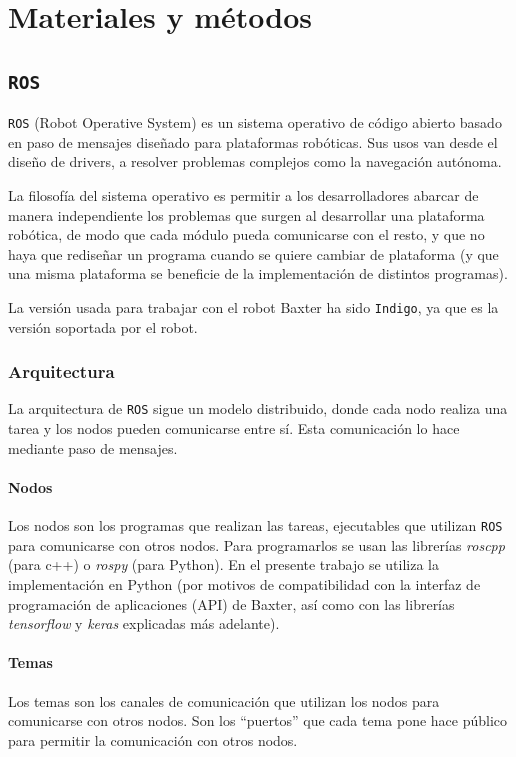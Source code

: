 \chapter{Materiales y métodos}
\newcommand{\ros}{\texttt{ROS} }
\section{\ros}
\ros (Robot Operative System) \cite{ros} es un sistema operativo de código abierto basado en paso de mensajes diseñado para plataformas robóticas. Sus usos van desde el diseño de drivers, a resolver problemas complejos como la navegación autónoma.

La filosofía del sistema operativo es permitir a los desarrolladores abarcar de manera independiente los problemas que surgen al desarrollar una plataforma robótica, de modo que cada módulo pueda comunicarse con el resto, y que no haya que rediseñar un programa cuando se quiere cambiar de plataforma (y que una misma plataforma se beneficie de la implementación de distintos programas).

La versión usada para trabajar con el robot Baxter \cite{baxter} ha sido \texttt{Indigo}, ya que es la versión soportada por el robot.
\subsection{Arquitectura}
La arquitectura de \ros sigue un modelo distribuido, donde cada nodo realiza una tarea y los nodos pueden comunicarse entre sí. Esta comunicación lo hace mediante paso de mensajes.
\subsubsection{Nodos}
Los nodos son los programas que realizan las tareas, ejecutables que utilizan \ros para comunicarse con otros nodos. Para programarlos se usan las librerías \textit{roscpp} (para c++) o \textit{rospy} (para Python). En el presente trabajo se utiliza la implementación en Python (por motivos de compatibilidad con la interfaz de programación de aplicaciones (API) de Baxter, así como con las librerías \textit{tensorflow} \cite{tensorflow} y \textit{keras} \cite{keras} explicadas más adelante).

\subsubsection{Temas}
Los temas son los canales de comunicación que utilizan los nodos para comunicarse con otros nodos. Son los ``puertos'' que cada tema pone hace público para permitir la comunicación con otros nodos.

